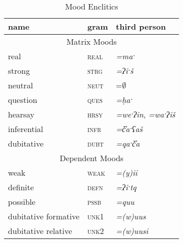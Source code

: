 \begin{table}[ht]
\centering
\caption{Mood Enclitics}
\label{table:moods}
\begin{tabular}{lll}
name                                       & gram                         & third person                           \\ \hline
\multicolumn{3}{|c|}{Matrix Moods}       \\ \hline
\multicolumn{1}{|l|}{real}               & \multicolumn{1}{l|}{\textsc{real}} & \multicolumn{1}{l|}{\textit{=maˑ}}             \\ \hline
\multicolumn{1}{|l|}{strong}                 & \multicolumn{1}{l|}{\textsc{strg}} & \multicolumn{1}{l|}{\textit{=ʔiˑš}}            \\ \hline
\multicolumn{1}{|l|}{neutral}              & \multicolumn{1}{l|}{\textsc{neut}} & \multicolumn{1}{l|}{=$\emptyset$\footnotemark}       \\ \hline
\multicolumn{1}{|l|}{question}             & \multicolumn{1}{l|}{\textsc{ques}} & \multicolumn{1}{l|}{\textit{=ḥaˑ}}             \\ \hline
\multicolumn{1}{|l|}{hearsay}              & \multicolumn{1}{l|}{\textsc{hrsy}} & \multicolumn{1}{l|}{\textit{=weˑʔin}, \textit{=waˑʔiš}} \\ \hline
\multicolumn{1}{|l|}{inferential}        & \multicolumn{1}{l|}{\textsc{infr}} & \multicolumn{1}{l|}{\textit{=č̓aˑʕaš}}        \\ \hline
\multicolumn{1}{|l|}{dubitative}           & \multicolumn{1}{l|}{\textsc{dubt}} & \multicolumn{1}{l|}{\textit{=qaˑč̓a}}          \\ \hline
\multicolumn{3}{|c|}{Dependent Moods} \\ \hline
\multicolumn{1}{|l|}{weak}                 & \multicolumn{1}{l|}{\textsc{weak}} & \multicolumn{1}{l|}{\textit{=(y)ii}}            \\ \hline
\multicolumn{1}{|l|}{definite}             & \multicolumn{1}{l|}{\textsc{defn}} & \multicolumn{1}{l|}{\textit{=ʔiˑtq}}            \\ \hline
\multicolumn{1}{|l|}{possible}             & \multicolumn{1}{l|}{\textsc{pssb}} & \multicolumn{1}{l|}{\textit{=quu}}              \\ \hline
\multicolumn{1}{|l|}{dubitative formative} & \multicolumn{1}{l|}{\textsc{unk1}} & \multicolumn{1}{l|}{\textit{=(w)uus}}           \\ \hline
\multicolumn{1}{|l|}{dubitative relative}  & \multicolumn{1}{l|}{\textsc{unk2}} & \multicolumn{1}{l|}{\textit{=(w)uusi}}          \\ \hline

\end{tabular}
\end{table}
